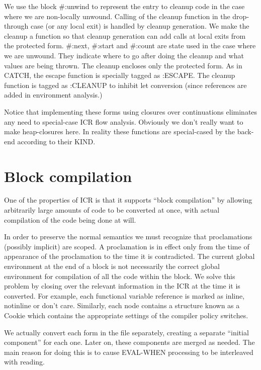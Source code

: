 We use the block \#:unwind to represent the entry to cleanup code in the case
where we are non-locally unwound.  Calling of the cleanup function in the
drop-through case (or any local exit) is handled by cleanup generation.  We
make the cleanup a function so that cleanup generation can add calls at local
exits from the protected form.  \#:next, \#:start and \#:count are state used in
the case where we are unwound.  They indicate where to go after doing the
cleanup and what values are being thrown.  The cleanup encloses only the
protected form.  As in CATCH, the escape function is specially tagged as
:ESCAPE.  The cleanup function is tagged as :CLEANUP to inhibit let conversion
(since references are added in environment analysis.)

Notice that implementing these forms using closures over continuations
eliminates any need to special-case ICR flow analysis.  Obviously we don't
really want to make heap-closures here.  In reality these functions are
special-cased by the back-end according to their KIND.

\section{Block compilation}

One of the properties of ICR is that it supports ``block compilation'' by allowing
arbitrarily large amounts of code to be converted at once, with actual
compilation of the code being done at will.


In order to preserve the normal semantics we must recognize that proclamations
(possibly implicit) are scoped.  A proclamation is in effect only from the time
of appearance of the proclamation to the time it is contradicted.  The current
global environment at the end of a block is not necessarily the correct global
environment for compilation of all the code within the block.  We solve this
problem by closing over the relevant information in the ICR at the time it is
converted.  For example, each functional variable reference is marked as
inline, notinline or don't care.  Similarly, each node contains a structure
known as a Cookie which contains the appropriate settings of the compiler
policy switches.

We actually convert each form in the file separately, creating a separate
``initial component'' for each one.  Later on, these components are merged as
needed.  The main reason for doing this is to cause EVAL-WHEN processing to be
interleaved with reading. 

